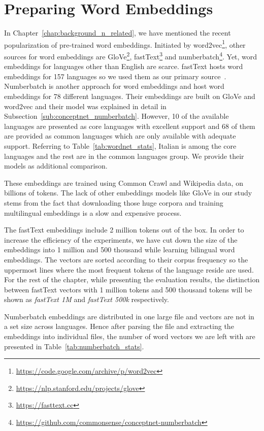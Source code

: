 \section{Preparing Word Embeddings}%
\label{sec:preparing_word_embeddings}

In Chapter~\ref{chap:background_n_related}, we have mentioned the recent popularization of pre-trained word embeddings.
Initiated by word2vec\footnote{\url{https://code.google.com/archive/p/word2vec}}, other sources for word embeddings are GloVe\footnote{\url{https://nlp.stanford.edu/projects/glove}}, fastText\footnote{\url{https://fasttext.cc}} and numberbatch\footnote{\url{https://github.com/commonsense/conceptnet-numberbatch}}.
Yet, word embeddings for languages other than English are scarce.
fastText hosts word embeddings for 157 languages so we used them as our primary source~\cite{grave_learning_2018}.
Numberbatch is another approach for word embeddings and \textcite{speer_conceptnet_2017} host word embeddings for 78 different languages.
Their embeddings are built on GloVe and word2vec and their model was explained in detail in Subsection~\ref{sub:conceptnet_numberbatch}.
However, 10 of the available languages are presented as core languages with excellent support and 68 of them are provided as common languages which are only available with adequate support.
Referring to Table~\ref{tab:wordnet_stats}, Italian is among the core languages and the rest are in the common languages group.
We provide their models as additional comparison.

These embeddings are trained using Common Crawl and Wikipedia data, on billions of tokens.
The lack of other embeddings models like GloVe in our study stems from the fact that downloading those huge corpora and training multilingual embeddings is a slow and expensive process.

The fastText embeddings include 2 million tokens out of the box.
In order to increase the efficiency of the experiments, we have cut down the size of the embeddings into 1 million and 500 thousand while learning bilingual word embeddings.
The vectors are sorted according to their corpus frequency so the uppermost lines where the most frequent tokens of the language reside are used.
For the rest of the chapter, while presenting the evaluation results, the distinction between fastText vectors with 1 million tokens and 500 thousand tokens will be shown as \emph{fastText 1M} and \emph{fastText 500k} respectively.

Numberbatch embeddings are distributed in one large file and vectors are not in a set size across languages.
Hence after parsing the file and extracting the embeddings into individual files, the number of word vectors we are left with are presented in Table~\ref{tab:numberbatch_stats}.

